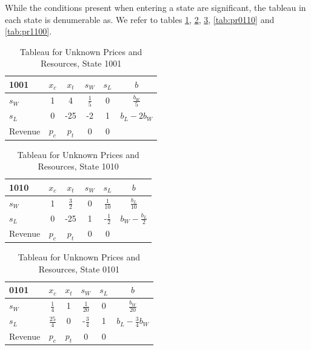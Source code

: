 While the conditions present when entering a state are significant,
the tableau in each state is denumerable as. We refer to tables
\ref{tab:pr1001}, \ref{tab:pr1010}, \ref{tab:pr0101}, \ref{tab:pr0110}
and \ref{tab:pr1100}. 

\begin{table}
\centering
\begin{tabular}{| l | c c c c | c |}
\hline
1001    & $x_c$ & $x_t$ & $s_W$ & $s_L$ & $b$\\
\hline
$s_W$   & 1     & 4      & $\frac{1}{5}$   & 0     & $\frac{b_W}{5}$\\
$s_L$   & 0     & -25    & -2              & 1     & $b_L - 2b_W$\\
\hline
Revenue & $p_c$    & $p_t$    & 0     & 0     &\\
\hline
\end{tabular}
  \caption[Tableau for Unknown Prices and Resources, State 1001]
          {Tableau for Unknown Prices and Resources, State 1001}
  \label{tab:pr1001}
\end{table}

\begin{table}
\centering
\begin{tabular}{| l | c c c c | c |}
\hline
1010    & $x_c$ & $x_t$ & $s_W$ & $s_L$ & $b$\\
\hline
$s_W$   & 1     & $\frac{3}{2}$  & 0   & $\frac{1}{10}$  & $\frac{b_L}{10}$\\
$s_L$   & 0     & -25            & 1   & -$\frac{1}{2}$  & $b_W - \frac{b_L}{2}$\\
\hline
Revenue & $p_c$    & $p_t$    & 0     & 0     &\\
\hline
\end{tabular}
  \caption[Tableau for Unknown Prices and Resources, State 1010]
          {Tableau for Unknown Prices and Resources, State 1010}
  \label{tab:pr1010}
\end{table}

\begin{table}
\centering
\begin{tabular}{| l | c c c c | c |}
\hline
0101    & $x_c$ & $x_t$ & $s_W$ & $s_L$ & $b$\\
\hline
$s_W$   & $\frac{1}{4}$   & 1  & $\frac{1}{20}$   & 0  & $\frac{b_W}{20}$\\
$s_L$   & $\frac{25}{4}$  & 0  & -$\frac{3}{4}$   & 1  & $b_L - \frac{3}{4}b_W$\\
\hline
Revenue & $p_c$    & $p_t$    & 0     & 0     &\\
\hline
\end{tabular}
  \caption[Tableau for Unknown Prices and Resources, State 0101]
          {Tableau for Unknown Prices and Resources, State 0101}
  \label{tab:pr0101}
\end{table}

